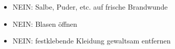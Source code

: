 
{%
\begin{itemize}
    \item[\Irritant] NEIN: Salbe, Puder, etc. auf frische 
    Brandwunde \cite {emergency9,PHTLS6}
    \item[\Irritant] NEIN: Blasen öffnen \cite{emergency9}
    \item[\Irritant] NEIN: festklebende Kleidung gewaltsam entfernen
\end{itemize}
}{

}{}{}{}


\cite{Kamolz2009,Verbrennungsmed2009Praehosp,Beneker2004,Loennecker2001,TertialeNotfallIntensivmed1}



